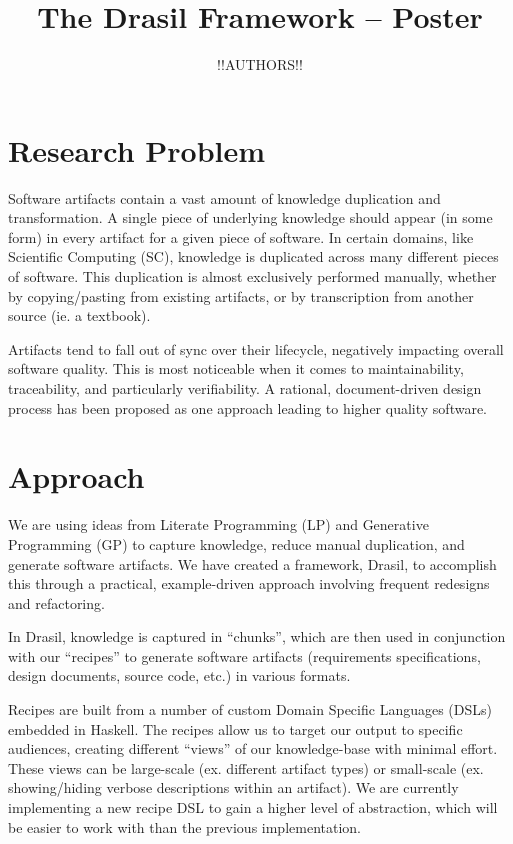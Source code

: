 \documentclass[twocolumn, 10pt]{article} %
\title{The Drasil Framework -- Poster}
\author{!!AUTHORS!!}
\begin{document}
\maketitle

\section{Research Problem}

Software artifacts contain a vast amount of knowledge duplication and
transformation. A single piece of underlying knowledge should appear (in some
form) in every artifact for a given piece of software. In certain domains,
like Scientific Computing (SC),
knowledge is duplicated across many different pieces of software. This
duplication is almost exclusively performed manually, whether by copying/pasting
from existing artifacts, or by transcription from another source (ie. a
textbook).

Artifacts tend to fall out of sync over their lifecycle,
negatively impacting overall software quality. This is most noticeable 
when it comes to maintainability, traceability, and particularly verifiability.
A rational, document-driven design process has been proposed as one approach
leading to higher quality software\cite{SmithAndKoothoor2016}.

\section{Approach}

We are using ideas from Literate Programming (LP) and Generative Programming
(GP) to capture knowledge, reduce manual duplication, and generate software
artifacts. We have created a framework, Drasil, to accomplish this through a
practical, example-driven approach involving frequent redesigns and refactoring.

In Drasil, knowledge is captured in ``chunks'', which are then used in
conjunction with our ``recipes'' to generate software artifacts (requirements
specifications, design documents, source code, etc.) in various formats.

Recipes are built from a number of custom Domain Specific Languages (DSLs)
embedded in Haskell. The recipes allow us to target our output to specific
audiences, creating different ``views'' of our knowledge-base with minimal
effort. These views can be large-scale (ex. different artifact types) or
small-scale (ex. showing/hiding verbose descriptions within an artifact). We are
currently implementing a new recipe DSL to gain a higher level of abstraction,
which will be easier to work with than the previous implementation.
\end{document}
